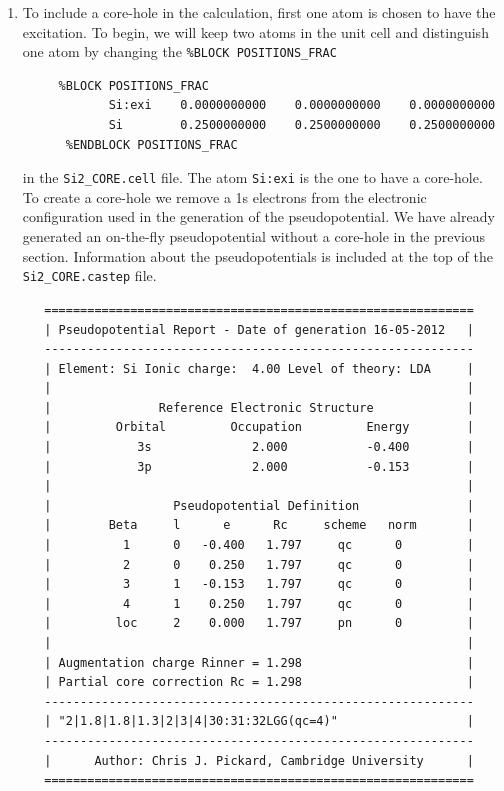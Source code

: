 \documentclass[a4paper,11pt,twoside]{book}
\begin{document}
{\begin{enumerate}
\item To include a core-hole in the calculation, first one atom is chosen to have the excitation.  To begin, we will keep two atoms in the unit cell and distinguish one atom by changing the \verb#%BLOCK POSITIONS_FRAC#
\begin{verbatim}
     %BLOCK POSITIONS_FRAC
            Si:exi    0.0000000000    0.0000000000    0.0000000000
            Si        0.2500000000    0.2500000000    0.2500000000
      %ENDBLOCK POSITIONS_FRAC
\end{verbatim}
in the \verb#Si2_CORE.cell# file.  The atom \verb#Si:exi# is the one to have a core-hole.  To create a core-hole we remove a 1s electrons from the electronic configuration used in the generation of the pseudopotential.  We have already generated an on-the-fly pseudopotential without a core-hole in the previous section.  Information about the pseudopotentials is included at the top of the \verb#Si2_CORE.castep# file.

\begin{verbatim}
   ============================================================
   | Pseudopotential Report - Date of generation 16-05-2012   |
   ------------------------------------------------------------
   | Element: Si Ionic charge:  4.00 Level of theory: LDA     |
   |                                                          |
   |               Reference Electronic Structure             |
   |         Orbital         Occupation         Energy        |
   |            3s              2.000           -0.400        |
   |            3p              2.000           -0.153        |
   |                                                          |
   |                 Pseudopotential Definition               |
   |        Beta     l      e      Rc     scheme   norm       |
   |          1      0   -0.400   1.797     qc      0         |
   |          2      0    0.250   1.797     qc      0         |
   |          3      1   -0.153   1.797     qc      0         |
   |          4      1    0.250   1.797     qc      0         |
   |         loc     2    0.000   1.797     pn      0         |
   |                                                          |
   | Augmentation charge Rinner = 1.298                       |
   | Partial core correction Rc = 1.298                       |
   ------------------------------------------------------------
   | "2|1.8|1.8|1.3|2|3|4|30:31:32LGG(qc=4)"                  |
   ------------------------------------------------------------
   |      Author: Chris J. Pickard, Cambridge University      |
   ============================================================
\end{verbatim}


\end{enumerate}}
\end{document}
